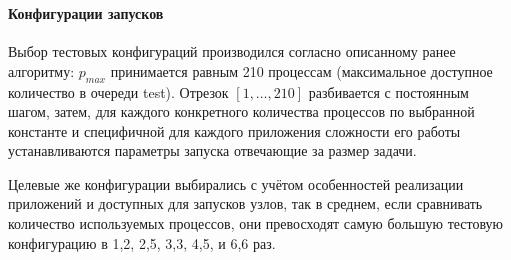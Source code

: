 \documentclass[unicode, t, 11pt]{beamer}%
\begin{document}
		\begin{frame}
			\frametitle{\insertsection}
			\framesubtitle{Конфигурации запусков}
			Выбор тестовых конфигураций производился согласно описанному ранее алгоритму: \(p_{max}\) принимается равным 210 процессам (максимальное доступное количество в очереди test). Отрезок \([1, \ldots, 210]\) разбивается с постоянным шагом, затем, для каждого конкретного количества процессов по выбранной константе и специфичной для каждого приложения сложности его работы устанавливаются параметры запуска отвечающие за размер задачи.

			Целевые же конфигурации выбирались с учётом особенностей реализации приложений и доступных для запусков узлов, так в среднем, если сравнивать количество используемых процессов, они превосходят самую большую тестовую конфигурацию в 1,2, 2,5, 3,3, 4,5, и 6,6 раз.

		\end{frame}
\end{document}
